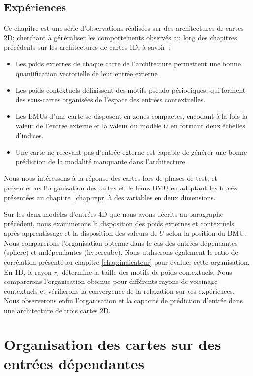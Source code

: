 \documentclass[../main]{subfiles}
\begin{document}
\subsection{Expériences}

Ce chapitre est une série d'observations réalisées sur des architectures de cartes 2D; cherchant à généraliser les comportements observés au long des chapitres précédents sur les architectures de cartes 1D, à savoir~:
\begin{itemize}
	\item Les poids externes de chaque carte de l'architecture permettent une bonne quantification vectorielle de leur entrée externe.
	\item Les poids contextuels définissent des motifs pseudo-périodiques, qui forment des sous-cartes organisées de l'espace des entrées contextuelles.
	\item Les BMUs d'une carte se disposent en zones compactes, encodant à la fois la valeur de l'entrée externe et la valeur du modèle $U$ en formant deux échelles d'indices.
	\item Une carte ne recevant pas d'entrée externe est capable de générer une bonne prédiction de la modalité manquante dans l'architecture.
\end{itemize}

Nous nous intéressons à la réponse des cartes lors de phases de test, et présenterons l'organisation des cartes et de leurs BMU en adaptant les tracés présentées au chapitre~\ref{chap:repr} à des variables en deux dimensions.

Sur les deux modèles d'entrées 4D que nous avons décrits au paragraphe précédent, nous examinerons la disposition des poids externes et contextuels après apprentissage et la disposition des valeurs de $U$ selon la position du BMU. Nous comparerons l'organisation obtenue dans le cas des entrées dépendantes (sphère) et indépendantes (hypercube). Nous utiliserons également le ratio de corrélation présenté au chapitre \ref{chap:indicateur} pour évaluer cette organisation.
En 1D, le rayon $r_c$ détermine la taille des motifs de poids contextuels. Nous comparerons l'organisation obtenue pour différents rayons de voisinage contextuels et vérifierons la convergence de la relaxation sur ces expériences.
Nous observerons enfin l'organisation et la capacité de prédiction d'entrée dans une architecture de trois cartes 2D.

\section{Organisation des cartes sur des entrées dépendantes \label{par:orga2D}}
\end{document}

